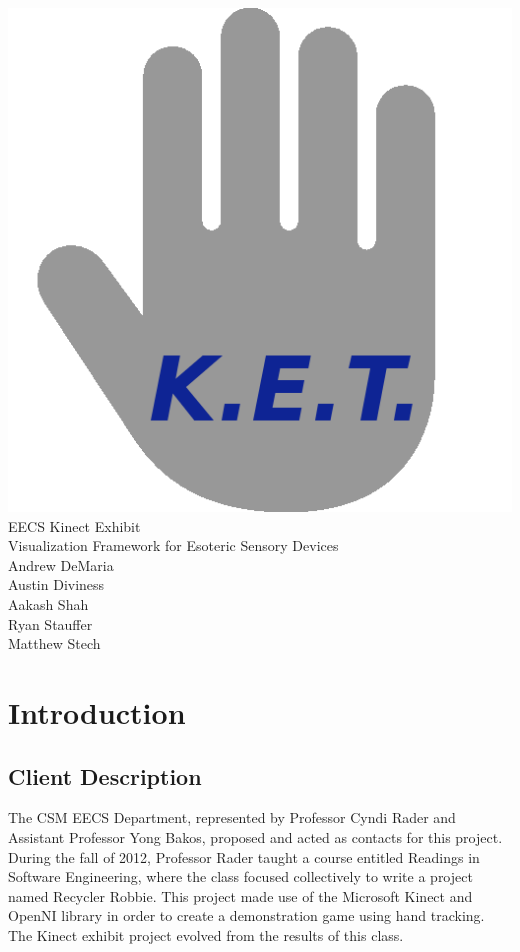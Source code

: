 \documentclass[11pt,letterpaper]{article}
\begin{document}
	\begin{center}
	\vspace*{\fill}
	\includegraphics[height=0.4\textheight]{logo} \\
	\linespread{2}
	\LARGE EECS Kinect Exhibit \\
	\Large Visualization Framework for Esoteric Sensory Devices \\
	\large Andrew DeMaria \\
	\linespread{1}
	\large Austin Diviness \\
	\large Aakash Shah \\
	\large Ryan Stauffer \\
	\large Matthew Stech \\
	\vspace*{\fill}
	\end{center}
	\pagebreak
 
	\tableofcontents
	\newpage
 
	\pagestyle{plain}
	\setcounter{page}{1}
	\section{Introduction}
	\subsection{Client Description}
	The CSM EECS Department, represented by Professor Cyndi Rader and 
	Assistant Professor Yong Bakos, proposed and acted as contacts for this 
	project. During the fall of 2012, Professor Rader taught a course entitled 
	Readings in Software Engineering, where the class focused collectively to 
	write a project named Recycler Robbie. This project made use of the 
	Microsoft Kinect and OpenNI library in order to create a demonstration 
	game using hand tracking. The Kinect exhibit project evolved from the 
	results of this class.
 
\end{document}

